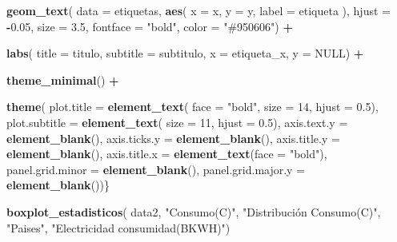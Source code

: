 \documentclass[
]{article}
\newenvironment{Shaded}{\begin{snugshade}}{\end{snugshade}}
\newcommand{\AttributeTok}[1]{\textcolor[rgb]{0.13,0.29,0.53}{#1}}
\newcommand{\ConstantTok}[1]{\textcolor[rgb]{0.56,0.35,0.01}{#1}}
\newcommand{\DecValTok}[1]{\textcolor[rgb]{0.00,0.00,0.81}{#1}}
\newcommand{\FloatTok}[1]{\textcolor[rgb]{0.00,0.00,0.81}{#1}}
\newcommand{\FunctionTok}[1]{\textcolor[rgb]{0.13,0.29,0.53}{\textbf{#1}}}
\newcommand{\NormalTok}[1]{#1}
\newcommand{\SpecialCharTok}[1]{\textcolor[rgb]{0.81,0.36,0.00}{\textbf{#1}}}
\newcommand{\StringTok}[1]{\textcolor[rgb]{0.31,0.60,0.02}{#1}}
\begin{document}
\begin{Shaded}
\begin{Highlighting}[]
    \FunctionTok{geom\_text}\NormalTok{(}
      \AttributeTok{data =}\NormalTok{ etiquetas,}
      \FunctionTok{aes}\NormalTok{(}
        \AttributeTok{x =}\NormalTok{ x,}
        \AttributeTok{y =}\NormalTok{ y,}
        \AttributeTok{label =}\NormalTok{ etiqueta}
\NormalTok{      ),}
      \AttributeTok{hjust =} \SpecialCharTok{{-}}\FloatTok{0.05}\NormalTok{,}
      \AttributeTok{size =} \FloatTok{3.5}\NormalTok{,}
      \AttributeTok{fontface =} \StringTok{"bold"}\NormalTok{,}
      \AttributeTok{color =} \StringTok{"\#950606"}\NormalTok{) }\SpecialCharTok{+}
    
    \FunctionTok{labs}\NormalTok{(}
      \AttributeTok{title =}\NormalTok{ titulo,}
      \AttributeTok{subtitle =}\NormalTok{ subtitulo,}
      \AttributeTok{x =}\NormalTok{ etiqueta\_x,}
      \AttributeTok{y =} \ConstantTok{NULL}\NormalTok{) }\SpecialCharTok{+}
    
    \FunctionTok{theme\_minimal}\NormalTok{() }\SpecialCharTok{+}
    
    \FunctionTok{theme}\NormalTok{(}
      \AttributeTok{plot.title =} \FunctionTok{element\_text}\NormalTok{(}
        \AttributeTok{face =} \StringTok{"bold"}\NormalTok{,}
        \AttributeTok{size =} \DecValTok{14}\NormalTok{,}
        \AttributeTok{hjust =} \FloatTok{0.5}\NormalTok{),}
      \AttributeTok{plot.subtitle =} \FunctionTok{element\_text}\NormalTok{(}
        \AttributeTok{size =} \DecValTok{11}\NormalTok{,}
        \AttributeTok{hjust =} \FloatTok{0.5}\NormalTok{),}
      \AttributeTok{axis.text.y =} \FunctionTok{element\_blank}\NormalTok{(),}
      \AttributeTok{axis.ticks.y =} \FunctionTok{element\_blank}\NormalTok{(),}
      \AttributeTok{axis.title.y =} \FunctionTok{element\_blank}\NormalTok{(),}
      \AttributeTok{axis.title.x =} \FunctionTok{element\_text}\NormalTok{(}\AttributeTok{face =} \StringTok{"bold"}\NormalTok{),}
      \AttributeTok{panel.grid.minor =} \FunctionTok{element\_blank}\NormalTok{(),}
      \AttributeTok{panel.grid.major.y =} \FunctionTok{element\_blank}\NormalTok{())\}}
\end{Highlighting}
\end{Shaded}

\begin{Shaded}
\begin{Highlighting}[]
\FunctionTok{boxplot\_estadisticos}\NormalTok{(}
\NormalTok{ data2,}
  \StringTok{"Consumo(C)"}\NormalTok{,}
  \StringTok{"Distribución Consumo(C)"}\NormalTok{,}
  \StringTok{"Paises"}\NormalTok{,}
  \StringTok{"Electricidad consumidad(BKWH)"}\NormalTok{)}
\end{Highlighting}
\end{Shaded}
\end{document}
